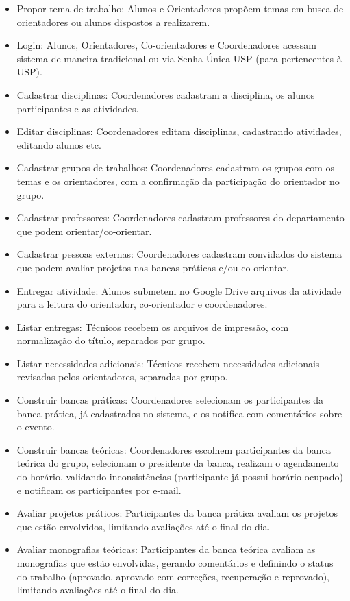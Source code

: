 \begin{itemize}
    \item Propor tema de trabalho: Alunos e Orientadores propõem temas em busca de orientadores ou alunos dispostos a realizarem.
    \item Login: Alunos, Orientadores, Co-orientadores e Coordenadores acessam sistema de maneira tradicional ou via Senha Única USP (para pertencentes à USP).
    \item Cadastrar disciplinas: Coordenadores cadastram a disciplina, os alunos participantes e as atividades.
    \item Editar disciplinas: Coordenadores editam disciplinas, cadastrando atividades, editando alunos etc.
    \item Cadastrar grupos de trabalhos: Coordenadores cadastram os grupos com os temas e os orientadores, com a confirmação da participação do orientador no grupo.
    \item Cadastrar professores: Coordenadores cadastram professores do departamento que podem orientar/co-orientar.
    \item Cadastrar pessoas externas: Coordenadores cadastram convidados do sistema que podem avaliar projetos nas bancas práticas e/ou co-orientar.
    \item Entregar atividade: Alunos submetem no Google Drive arquivos da atividade para a leitura do orientador, co-orientador e coordenadores.
    \item Listar entregas: Técnicos recebem os arquivos de impressão, com normalização do título, separados por grupo.
    \item Listar necessidades adicionais: Técnicos recebem necessidades adicionais revisadas pelos orientadores, separadas por grupo.
    \item Construir bancas práticas: Coordenadores selecionam os participantes da banca prática, já cadastrados no sistema, e os notifica com comentários sobre o evento.
    \item Construir bancas teóricas: Coordenadores escolhem participantes da banca teórica do grupo, selecionam o presidente da banca, realizam o agendamento do horário, validando inconsistências (participante já possui horário ocupado) e notificam os participantes por e-mail.
    \item Avaliar projetos práticos: Participantes da banca prática avaliam os projetos que estão envolvidos, limitando avaliações até o final do dia.
    \item Avaliar monografias teóricas: Participantes da banca teórica avaliam as monografias que estão envolvidas, gerando comentários e definindo o status do trabalho (aprovado, aprovado com correções, recuperação e reprovado), limitando avaliações até o final do dia.

\end{itemize}
